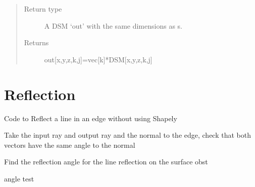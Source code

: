\documentclass[letterpaper,10pt,english]{sphinxmanual}
\begin{document}
\begin{fulllineitems}
\begin{fulllineitems}
\begin{quote}
\begin{description}
\item[{Return type}] \leavevmode
A DSM `out' with the same dimensions as s.

\item[{Returns}] \leavevmode
out{[}x,y,z,k,j{]}=vec{[}k{]}*DSM{[}x,y,z,k,j{]}

\end{description}\end{quote}

\end{fulllineitems}


\end{fulllineitems}



\chapter{Reflection}
\label{index:module-reflection}\label{index:reflection}
Code to Reflect a line in an edge without using Shapely

\begin{fulllineitems}
\label{index:reflection.errorcheck}
Take the input ray and output ray and the normal to the edge,
check that both vectors have the same angle to the normal

\end{fulllineitems}


\begin{fulllineitems}
\label{index:reflection.refangle}
Find the reflection angle for the line reflection on the surface obst

\end{fulllineitems}


\begin{fulllineitems}
\label{index:reflection.test3}
angle test

\end{fulllineitems}
\end{document}
